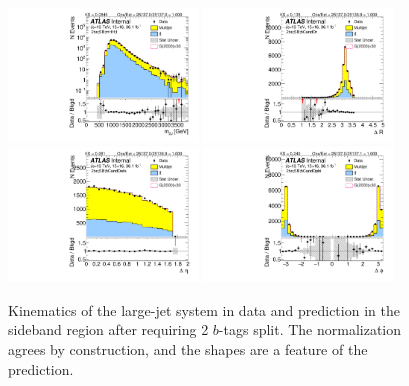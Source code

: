 \begin{figure}[htbp!]
\begin{center}
\includegraphics[width=0.45\textwidth,angle=-90]{figures/boosted/Sideband/b77_TwoTag_split_Sideband_mHH_l_1.pdf}
\includegraphics[width=0.45\textwidth,angle=-90]{figures/boosted/Sideband/b77_TwoTag_split_Sideband_hCandDr.pdf}\\
\includegraphics[width=0.45\textwidth,angle=-90]{figures/boosted/Sideband/b77_TwoTag_split_Sideband_hCandDeta.pdf}
\includegraphics[width=0.45\textwidth,angle=-90]{figures/boosted/Sideband/b77_TwoTag_split_Sideband_hCandDphi.pdf}
  \caption{Kinematics of the large-\R jet system in data and prediction in the sideband region after requiring 2 $b$-tags split. The normalization agrees by construction, and the shapes are a feature of the prediction. }
  \label{fig:boosted-2bs-sideband-ak10-system}
\end{center}
\end{figure}

